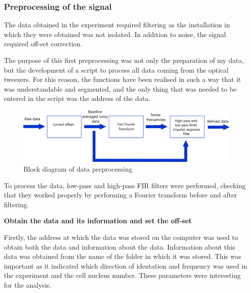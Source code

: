 \documentclass[12pt, a4paper]{article} %
\begin{document}
\subsubsection{Preprocessing of the signal}

The data obtained in the experiment required filtering as the installation in which they were obtained was not isolated. In addition to noise, the signal required off-set correction. 

\setlength{\parskip}{4mm}

The purpose of this first preprocessing was not only the preparation of my data, but the development of a script to process all data coming from the optical tweezers. For this reason, the functions have been realised in such a way that it was understandable and segmented, and the only thing that was needed to be entered in the script was the address of the data.

\begin{figure}[htbp]
	\centering
	\includegraphics[width=1\textwidth]{figures/esquema_preprocesado_metodos_1.png}
	\caption{Block diagram of data preprocessing}
	\label{fig:esquema_preprocesado}
\end{figure}

To process the data, low-pass and high-pass FIR filters were performed, checking that they worked properly by performing a Fourier transform before and after filtering. 

\setlength{\parskip}{8mm}
\setlength{\parindent}{0pt}

\textbf{Obtain the data and its information and set the off-set}
\setlength{\parskip}{0mm}

Firstly, the address at which the data was stored on the computer was used to obtain both the data and information about the data. Information about this data was obtained from the name of the folder in which it was stored. This was important as it indicated which direction of identation and frequency was used in the experiment and the cell nucleus number. These parameters were interesting for the analysis.
\end{document}
